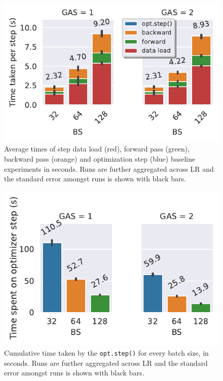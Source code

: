 \begin{minipage}{\linewidth}
    \begin{minipage}{0.45\linewidth}
        \begin{figure}[H]
            \centering
            \includegraphics[width=\textwidth]{./figures/06_barplot-times_baseline-16vCPUs-GAS-1.pdf}
            \caption{
                Average times of step data load (red), forward pass (green), backward pass (orange) and optimization step (blue) baseline experiments in seconds.
                Runs are further aggregated across LR and the standard error amongst runs is shown with black bars.
            }
            \label{fig:baseline-times-stacked}
        \end{figure}
    \end{minipage}
    \hspace{0.05\linewidth}
    \begin{minipage}{0.45\linewidth}
        \begin{figure}[H]
            \centering
            \includegraphics[width=\textwidth]{./figures/06_barplot-times-opt_baseline-16vCPUs-GAS-1.pdf}
            \caption{
                Cumulative time taken by the \texttt{opt.step()} for every batch size, in seconds.
                Runs are further aggregated across LR and the standard error amongst runs is shown with black bars.
            }
            \label{fig:baseline-times-opt}
        \end{figure}
    \end{minipage}
\end{minipage}

